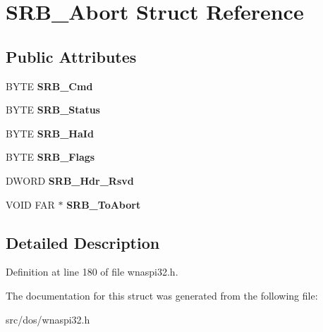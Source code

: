 \hypertarget{structSRB__Abort}{\section{S\-R\-B\-\_\-\-Abort Struct Reference}
\label{structSRB__Abort}
}
\subsection*{Public Attributes}
\begin{DoxyCompactItemize}
\item 
\hypertarget{structSRB__Abort_ab60c0885cfbcee701ae4d0e4a8527a67}{B\-Y\-T\-E {\bfseries S\-R\-B\-\_\-\-Cmd}}\label{structSRB__Abort_ab60c0885cfbcee701ae4d0e4a8527a67}

\item 
\hypertarget{structSRB__Abort_a931f79f06d136eb32b0d5cd487e54d80}{B\-Y\-T\-E {\bfseries S\-R\-B\-\_\-\-Status}}\label{structSRB__Abort_a931f79f06d136eb32b0d5cd487e54d80}

\item 
\hypertarget{structSRB__Abort_a456ad39a7777e7e2056bd29092ed9f84}{B\-Y\-T\-E {\bfseries S\-R\-B\-\_\-\-Ha\-Id}}\label{structSRB__Abort_a456ad39a7777e7e2056bd29092ed9f84}

\item 
\hypertarget{structSRB__Abort_a96e11bea815b549d65033db27398fe87}{B\-Y\-T\-E {\bfseries S\-R\-B\-\_\-\-Flags}}\label{structSRB__Abort_a96e11bea815b549d65033db27398fe87}

\item 
\hypertarget{structSRB__Abort_abe86cedb9ad2ea3aab99f5acc152edcc}{D\-W\-O\-R\-D {\bfseries S\-R\-B\-\_\-\-Hdr\-\_\-\-Rsvd}}\label{structSRB__Abort_abe86cedb9ad2ea3aab99f5acc152edcc}

\item 
\hypertarget{structSRB__Abort_a36be77fe272c20ada3f3efda91b14e48}{V\-O\-I\-D F\-A\-R $\ast$ {\bfseries S\-R\-B\-\_\-\-To\-Abort}}\label{structSRB__Abort_a36be77fe272c20ada3f3efda91b14e48}

\end{DoxyCompactItemize}


\subsection{Detailed Description}


Definition at line 180 of file wnaspi32.\-h.



The documentation for this struct was generated from the following file\-:\begin{DoxyCompactItemize}
\item 
src/dos/wnaspi32.\-h\end{DoxyCompactItemize}
